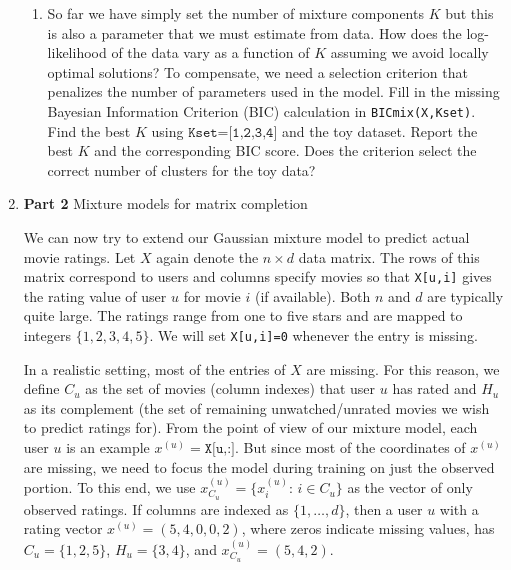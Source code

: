 \begin{enumerate}
\begin{enumerate}
\item So far we have simply set the number of mixture components $K$ but this is also a parameter that we must estimate from data. How does the log-likelihood of the data vary as a function of $K$ assuming we avoid locally optimal solutions? To compensate, we need a selection criterion that penalizes the number of parameters used in the model. Fill in the missing Bayesian Information Criterion (BIC) calculation in \texttt{BICmix(X,Kset)}. Find the best $K$ using $\texttt{Kset=[1,2,3,4]}$ and the toy dataset. Report the best $K$ and the corresponding BIC score. Does the criterion select the correct number of clusters for the toy data?

\end{enumerate}

\item {\bf Part 2} Mixture models for matrix completion

We can now try to extend our Gaussian mixture model to predict actual movie ratings. Let $X$ again denote the $n \times d$ data matrix. The rows of this matrix correspond to users and columns specify movies so that \texttt{X[u,i]} gives the rating value of user $u$ for movie $i$ (if available). Both $n$ and $d$ are typically quite large. The ratings range from one to five stars and are mapped to integers $\{1,2,3,4,5\}$. We will set \texttt{X[u,i]=0} whenever the entry is missing. 

In a realistic setting, most of the entries of $X$ are missing. For this reason, we define $C_u$ as the set of movies (column indexes) that user $u$ has rated and $H_u$ as its complement (the set of remaining unwatched/unrated movies we wish to predict ratings for). From the point of view of our mixture model, each user $u$ is an example $x^{(u)}=\texttt{X[u,:]}$. But since most of the coordinates of $x^{(u)}$ are missing, we need to focus the model during training on just the observed portion. To this end, we use $x_{C_u}^{(u)} = \{x^{(u)}_i:\, i\in C_u\}$ as the vector of only observed ratings. If columns are indexed as $\{1,\ldots,d\}$, then a user $u$ with a rating vector $x^{(u)} =  (5, 4, 0, 0, 2)$, where zeros indicate missing values, has $C_{u} = \{1, 2, 5\}$, $H_{u} = \{ 3, 4\}$, and $x^{(u)}_{C_u} = (5, 4, 2)$.


\end{enumerate}
